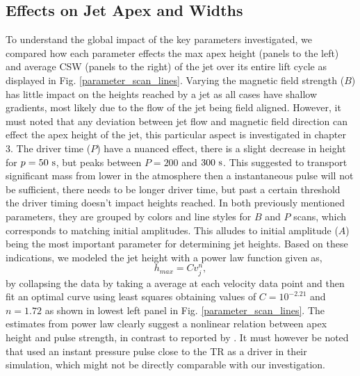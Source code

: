 \documentclass[12pt]{ociamthesis}
\newcommand{\fref}[1]{Fig. \eqref{#1}}
\newcommand{\np}{\\ \\}
\begin{document}
\subsection{Effects on Jet Apex and Widths}
\label{subsec:jet_apex_widths}
To understand the global impact of the key parameters investigated, we compared how each parameter effects the max apex height (panels to the left) and average CSW (panels to the right) of the jet over its entire lift cycle as displayed in \fref{parameter_scan_lines}. Varying the magnetic field strength ($B$) has little impact on the heights reached by a jet as all cases have shallow gradients, most likely due to the flow of the jet being field aligned. However, it must noted that any deviation between jet flow and magnetic field direction can effect the apex height of the jet, this particular aspect is investigated in chapter 3. The driver time ($P$) have a nuanced effect, there is a slight decrease in height for $p=50~\rm{s}$, but peaks between $P=200$ and $300~\rm{s}$. This suggested to transport significant mass from lower in the atmosphere then a instantaneous pulse will not be sufficient, there needs to be longer driver time, but past a certain threshold the driver timing doesn't impact heights reached. In both previously mentioned parameters, they are grouped by colors and line styles for $B$ and $P$ scans, which corresponds to matching initial amplitudes. This alludes to initial amplitude ($A$) being the most important parameter for determining jet heights. Based on these indications, we modeled the jet height with a power law function given as,   
\begin{equation}
h_{max} = C v_j^{n},
\end{equation} 
by collapsing the data by taking a average at each velocity data point and then fit an optimal curve using least squares obtaining values of $C= 10^{-2.21}$ and $n= 1.72$ as shown in lowest left panel in \fref{parameter_scan_lines}. The estimates from power law clearly suggest a nonlinear relation between apex height and pulse strength, in contrast to reported by \citet{Singh2019}. It must however be noted that \citet{Singh2019} used an instant pressure pulse close to the TR as a driver in their simulation, which might not be directly comparable with our investigation. \np  
%
\end{document}
